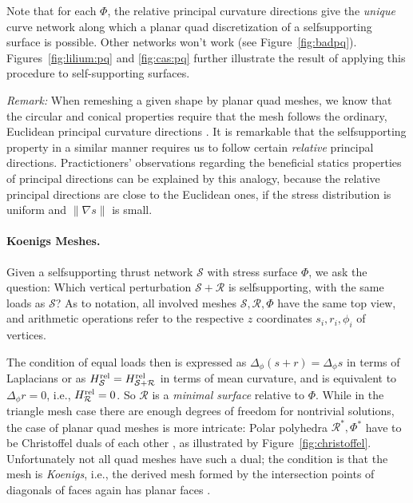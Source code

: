 \documentclass[annual]{acmsiggraph}
\def\rel{{\mathord{{\rm rel}}}}
\def\SS{{\mathcal S}}
\def\RR{{\mathcal R}}
\begin{document}
Note that for each $\Phi$, the relative principal curvature directions give the
\emph{unique} curve network along which a planar quad discretization of a
self\dash supporting surface is possible. Other networks won't work 
(see Figure~\ref{fig:badpq}).
Figures~\ref{fig:lilium:pq} and \ref{fig:cas:pq}
further illustrate the result of applying this procedure to
self-supporting surfaces.




{\em Remark:} When remeshing a given shape by planar quad meshes, we know
that the circular and conical properties require that the mesh follows the
ordinary, Euclidean principal curvature directions \cite{Liu2006}. It is
remarkable that the self\dash supporting property in a similar manner
requires us to follow certain {\em relative} principal directions.
Practictioners' observations regarding the beneficial statics properties
of principal directions can be explained by this analogy, because the
relative principal directions are close to the Euclidean ones, if the
stress distribution is uniform and $\|\nabla s\|$ is small.



\paragraph{Koenigs Meshes.}

Given a self\dash supporting thrust network $\SS$ with stress surface
$\Phi$, we ask the question:
Which vertical perturbation $\SS+\RR$ is self\dash supporting, with the same
loads as $\SS$? As to notation, all involved meshes $\SS,\RR,\Phi$ have the
same top view, and arithmetic operations refer to the respective $z$
coordinates
$s_i,r_i,\phi_i$ of vertices.

The condition of equal loads then is expressed as
$\Delta_\phi(s+r)=\Delta_\phi s$ in terms of Laplacians or
as $H^\rel_\SS=H^\rel_{\SS+\RR}$ in terms of mean curvature, and is equivalent
to
	$ \Delta_\phi r = 0$,  i.e., 
	$H^\rel_\RR = 0$.
 So $\RR$ is a {\em minimal surface} relative to $\Phi$.  While in the
triangle mesh case there are enough degrees of freedom for nontrivial
solutions, the case of planar quad meshes is more intricate:
Polar polyhedra $\RR^*,\Phi^*$ have to be
Christoffel duals of each other \cite{Pottmann2007}, as illustrated by
Figure~\ref{fig:christoffel}. Unfortunately not all quad meshes
have such a dual; the condition is that the mesh is {\em Koenigs}, i.e.,
the derived mesh formed by the intersection points of diagonals of faces
again has planar faces \cite{bobenko-2008-ddg}.
\end{document}
